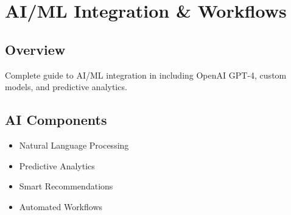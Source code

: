 \chapter{AI/ML Integration \& Workflows}
\label{ch:ai-ml-integration}

\section{Overview}
Complete guide to AI/ML integration in \lifeos{} including OpenAI GPT-4, custom models, and predictive analytics.

\section{AI Components}
\begin{itemize}
    \item Natural Language Processing
    \item Predictive Analytics
    \item Smart Recommendations
    \item Automated Workflows
\end{itemize}


